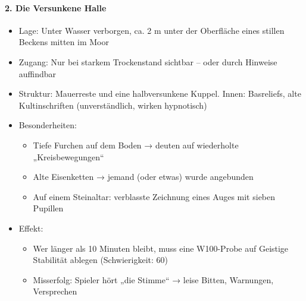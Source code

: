 \paragraph{2. Die Versunkene Halle}
\begin{itemize}
\item Lage: Unter Wasser verborgen, ca. 2 m unter der Oberfläche eines stillen Beckens mitten im Moor
\item Zugang: Nur bei starkem Trockenstand sichtbar – oder durch Hinweise auffindbar
\item Struktur: Mauerreste und eine halbversunkene Kuppel. Innen: Basreliefs, alte Kultinschriften (unverständlich, wirken hypnotisch)
\item Besonderheiten:
	\begin{itemize}
    \item Tiefe Furchen auf dem Boden → deuten auf wiederholte „Kreisbewegungen“
    \item Alte Eisenketten → jemand (oder etwas) wurde angebunden
    \item Auf einem Steinaltar: verblasste Zeichnung eines Auges mit sieben Pupillen
	\end{itemize}
\item Effekt:
	\begin{itemize}
    \item Wer länger als 10 Minuten bleibt, muss eine W100-Probe auf Geistige Stabilität ablegen (Schwierigkeit: 60)
    \item Misserfolg: Spieler hört „die Stimme“ → leise Bitten, Warnungen, Versprechen
	\end{itemize}
\end{itemize}

